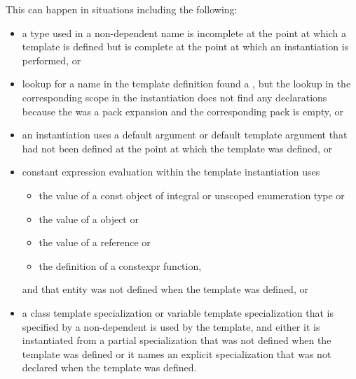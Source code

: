 \begin{note}
This can happen in situations including the following:
\begin{itemize}
\item a type used in a non-dependent name is incomplete at the point at which a
template is defined but is complete at the point at which an instantiation is
performed, or

\item lookup for a name in the template definition found a ,
but the lookup in the corresponding scope in the instantiation
does not find any declarations because the 
was a pack expansion and the corresponding pack is empty, or

\item an instantiation uses a default argument or default template argument
that had not been defined at the point at which the template was defined, or

\item constant expression evaluation within the template
instantiation uses
  \begin{itemize}
  \item the value of a const object of integral or unscoped enumeration type or
  \item the value of a  object or
  \item the value of a reference or
  \item the definition of a constexpr function,
  \end{itemize}
and that entity was not defined when the template was defined, or

\item a class template specialization or variable template specialization that
is specified by a non-dependent  is used by
the template, and either it is instantiated from a partial specialization that
was not defined when the template was defined or it names an explicit
specialization that was not declared when the template was defined.
\end{itemize}
\end{note}


